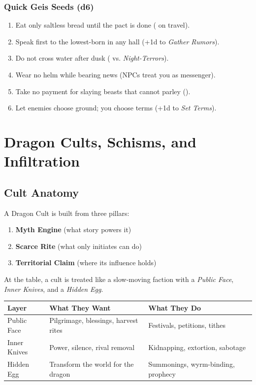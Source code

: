 \documentclass[11pt,letterpaper]{article}
\begin{document}
\subsubsection{Quick Geis Seeds (d6)}
\begin{enumerate}[leftmargin=*]
\item Eat only saltless bread until the pact is done ( on travel).
\item Speak first to the lowest-born in any hall (+1d to \textit{Gather Rumors}).
\item Do not cross water after dusk ( vs. \textit{Night-Terrors}).
\item Wear no helm while bearing news (NPCs treat you as messenger).
\item Take no payment for slaying beasts that cannot parley ().
\item Let enemies choose ground; you choose terms (+1d to \textit{Set Terms}).
\end{enumerate}

\section{Dragon Cults, Schisms, and Infiltration}


\subsection{Cult Anatomy}

A Dragon Cult is built from three pillars:
\begin{enumerate}[leftmargin=*]
\item \textbf{Myth Engine} (what story powers it)
\item \textbf{Scarce Rite} (what only initiates can do)
\item \textbf{Territorial Claim} (where its influence holds)
\end{enumerate}

At the table, a cult is treated like a slow-moving faction with a \textit{Public Face}, \textit{Inner Knives}, and a \textit{Hidden Egg}.

\begin{longtable}{@{}lll@{}}
\toprule
\textbf{Layer} & \textbf{What They Want} & \textbf{What They Do} \\
\midrule
Public Face & Pilgrimage, blessings, harvest rites & Festivals, petitions, tithes \\
Inner Knives & Power, silence, rival removal & Kidnapping, extortion, sabotage \\
Hidden Egg & Transform the world for the dragon & Summonings, wyrm-binding, prophecy \\
\bottomrule
\end{longtable}
\end{document}
